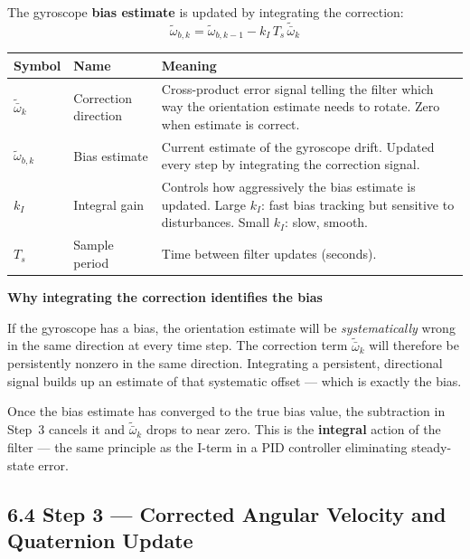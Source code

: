 \documentclass[12pt, a4paper]{article}
\begin{document}
The gyroscope \textbf{bias estimate} is updated by integrating the
correction:
\[
  \tilde{\omega}_{b,k}
  = \tilde{\omega}_{b,k-1} - k_I\, T_s\, \tilde{\bar{\omega}}_k
\]

\begin{center}
\begin{tabular}{@{} l p{2.8cm} p{7.6cm} @{}}
  \toprule
  Symbol & Name & Meaning \\
  \midrule
  $\tilde{\bar{\omega}}_k$ & Correction direction &
    Cross-product error signal telling the filter which way the orientation
    estimate needs to rotate. Zero when estimate is correct. \\[3pt]
  $\tilde{\omega}_{b,k}$ & Bias estimate &
    Current estimate of the gyroscope drift.
    Updated every step by integrating the correction signal. \\[3pt]
  $k_I$ & Integral gain &
    Controls how aggressively the bias estimate is updated.
    Large $k_I$: fast bias tracking but sensitive to disturbances.
    Small $k_I$: slow, smooth. \\[3pt]
  $T_s$ & Sample period & Time between filter updates (seconds). \\
  \bottomrule
\end{tabular}
\end{center}

\begin{notebox}
  \textbf{Why integrating the correction identifies the bias}

  If the gyroscope has a bias, the orientation estimate will be
  \emph{systematically} wrong in the same direction at every time step.
  The correction term $\tilde{\bar{\omega}}_k$ will therefore be
  persistently nonzero in the same direction.
  Integrating a persistent, directional signal builds up an estimate of
  that systematic offset --- which is exactly the bias.

  Once the bias estimate has converged to the true bias value, the
  subtraction in Step~3 cancels it and $\tilde{\bar{\omega}}_k$ drops
  to near zero.
  This is the \textbf{integral} action of the filter --- the same
  principle as the I-term in a PID controller eliminating steady-state
  error.
\end{notebox}

\subsection*{6.4 \quad Step 3 --- Corrected Angular Velocity and Quaternion
Update}
\end{document}
